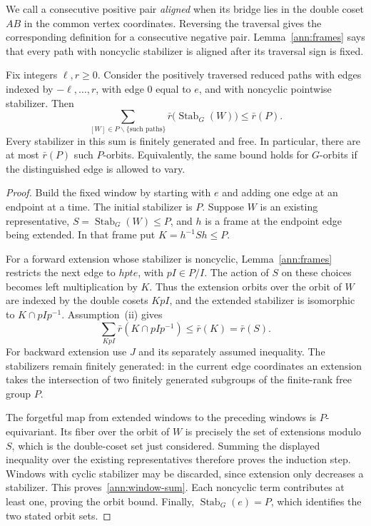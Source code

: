 We call a consecutive positive pair \emph{aligned} when its bridge lies
in the double coset $AB$ in the common vertex coordinates.  Reversing the
traversal gives the corresponding definition for a consecutive negative
pair.  Lemma~\ref{ann:frames} says that every path with noncyclic
stabilizer is aligned after its traversal sign is fixed.

\begin{lemma}
\label{ann:window-bound}
Fix integers $\ell,r\geq0$.  Consider the positively traversed reduced
paths with edges indexed by $-\ell,\ldots,r$, with edge $0$ equal to $e$,
and with noncyclic pointwise stabilizer.  Then
\begin{equation}
 \sum_{[W]\in P\backslash\{\text{such paths}\}}
       \bar r\bigl(\operatorname{Stab}_G(W)\bigr)
 \leq\bar r(P).
 \label{ann:window-sum}
\end{equation}
Every stabilizer in this sum is finitely generated and free.  In
particular, there are at most $\bar r(P)$ such $P$-orbits.  Equivalently,
the same bound holds for $G$-orbits if the distinguished edge is allowed
to vary.
\end{lemma}

\begin{proof}
Build the fixed window by starting with $e$ and adding one edge at an
endpoint at a time.  The initial stabilizer is $P$.  Suppose $W$ is an
existing representative, $S=\operatorname{Stab}_G(W)\leq P$, and $h$
is a frame at the endpoint edge being extended.  In that frame put
$K=h^{-1}Sh\leq P$.

For a forward extension whose stabilizer is noncyclic,
Lemma~\ref{ann:frames} restricts the next edge to $hpte$, with
$pI\in P/I$.  The action of $S$ on these choices becomes left
multiplication by $K$.  Thus the extension orbits over the orbit of $W$
are indexed by the double cosets $KpI$, and the extended stabilizer is
isomorphic to $K\cap pIp^{-1}$.  Assumption~\textup{(ii)} gives
\[
 \sum_{KpI}\bar r(K\cap pIp^{-1})\leq\bar r(K)=\bar r(S).
\]
For backward extension use $J$ and its separately assumed inequality.
The stabilizers remain finitely generated: in the current edge
coordinates an extension takes the intersection of two finitely generated
subgroups of the finite-rank free group $P$.

The forgetful map from extended windows to the preceding windows is
$P$-equivariant.  Its fiber over the orbit of $W$ is precisely the set of
extensions modulo $S$, which is the double-coset set just considered.
Summing the displayed inequality over the existing representatives
therefore proves the induction step.  Windows with cyclic stabilizer
may be discarded, since extension only decreases a stabilizer.  This
proves~\eqref{ann:window-sum}.  Each noncyclic term contributes at least
one, proving the orbit bound.  Finally,
$\operatorname{Stab}_G(e)=P$, which identifies the two stated orbit sets.
\end{proof}

